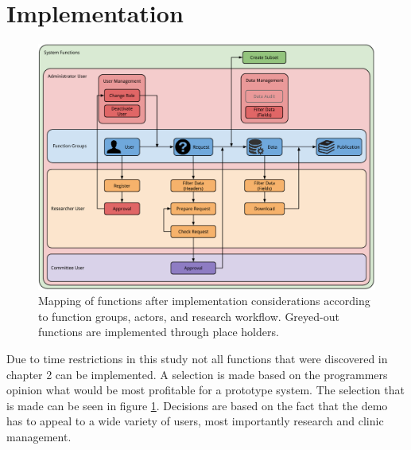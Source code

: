 \section{Implementation}


\begin{figure}[!b]
	\centering
	\includegraphics[width=1.0\linewidth]{images/functions-implemented}
	\caption{
		Mapping of functions after implementation considerations according to function groups, actors, and research workflow.
		Greyed-out functions are implemented through place holders. 
	}
	\label{fig:functions-implemented}
\end{figure}


Due to time restrictions in this study not all functions that were discovered in chapter 2 can be implemented.
A selection is made based on the programmers opinion what would be most profitable for a prototype system.
The selection that is made can be seen in figure \ref{fig:functions-implemented}.
Decisions are based on the fact that the demo has to appeal to a wide variety of users, most importantly research and clinic management.

